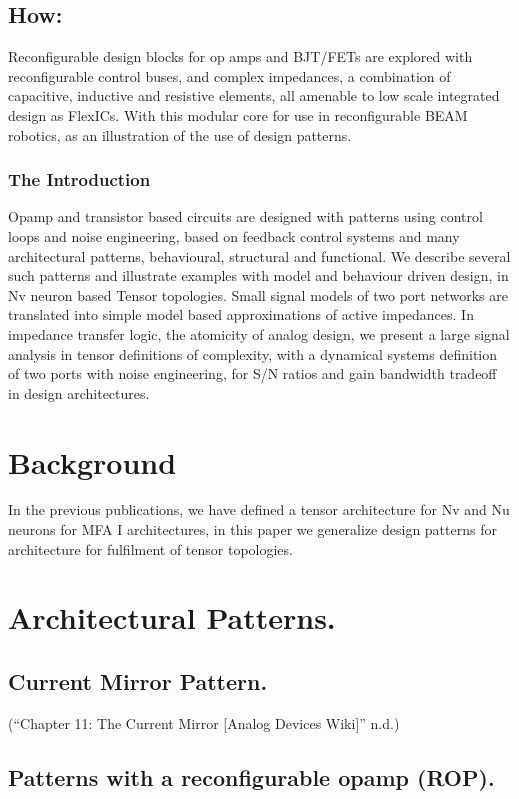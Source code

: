 \documentclass[conference]{IEEEtran}
\begin{document}
\subsection{How:}
Reconfigurable design blocks for op amps and BJT/FETs are explored with reconfigurable control buses,
and complex impedances, a combination of capacitive, inductive and resistive elements, all amenable to
low scale integrated design as FlexICs. With this modular core for use in reconfigurable BEAM robotics,
as an illustration of the use of design patterns.
\subsubsection{The Introduction}
Opamp and transistor based circuits are
designed with patterns using control loops
and noise engineering, based on feedback
control systems and many architectural
patterns, behavioural, structural and
functional. We describe several such
patterns and illustrate examples with model
and behaviour driven design, in Nv neuron
based Tensor topologies.
Small signal models of two port networks
are translated into simple model based
approximations of active impedances. In
impedance transfer logic, the atomicity of
analog design, we present a large signal
analysis in tensor definitions of complexity,
with a dynamical systems definition of two
ports with noise engineering, for S/N ratios
and gain bandwidth tradeoff in design
architectures.


\section{Background}
In the previous publications, we have
defined a tensor architecture for Nv and Nu
neurons for MFA I architectures, in this
paper we generalize design patterns for
architecture for fulfilment of tensor
topologies.

\section{Architectural Patterns.}

\subsection{Current Mirror Pattern.}
(“Chapter 11: The Current Mirror [Analog
Devices Wiki]” n.d.)
\subsection{Patterns with a reconfigurable opamp
(ROP).}
\end{document}
